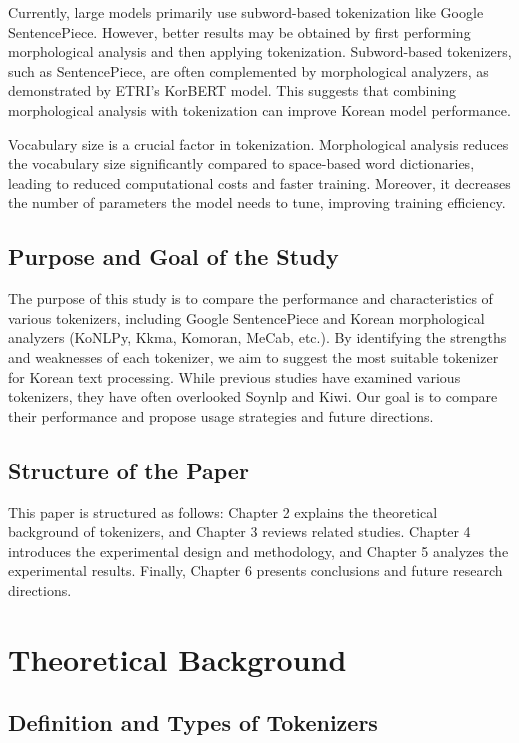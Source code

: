 \documentclass{article}
\begin{document}
Currently, large models primarily use subword-based tokenization like Google SentencePiece. However, better results may be obtained by first performing morphological analysis and then applying tokenization. Subword-based tokenizers, such as SentencePiece, are often complemented by morphological analyzers, as demonstrated by ETRI's KorBERT model. This suggests that combining morphological analysis with tokenization can improve Korean model performance.

Vocabulary size is a crucial factor in tokenization. Morphological analysis reduces the vocabulary size significantly compared to space-based word dictionaries, leading to reduced computational costs and faster training. Moreover, it decreases the number of parameters the model needs to tune, improving training efficiency.

\subsection{Purpose and Goal of the Study}

The purpose of this study is to compare the performance and characteristics of various tokenizers, including Google SentencePiece and Korean morphological analyzers (KoNLPy, Kkma, Komoran, MeCab, etc.). By identifying the strengths and weaknesses of each tokenizer, we aim to suggest the most suitable tokenizer for Korean text processing. While previous studies have examined various tokenizers, they have often overlooked Soynlp and Kiwi. Our goal is to compare their performance and propose usage strategies and future directions.

\subsection{Structure of the Paper}

This paper is structured as follows: Chapter 2 explains the theoretical background of tokenizers, and Chapter 3 reviews related studies. Chapter 4 introduces the experimental design and methodology, and Chapter 5 analyzes the experimental results. Finally, Chapter 6 presents conclusions and future research directions.

\section{Theoretical Background}

\subsection{Definition and Types of Tokenizers}
\end{document}
